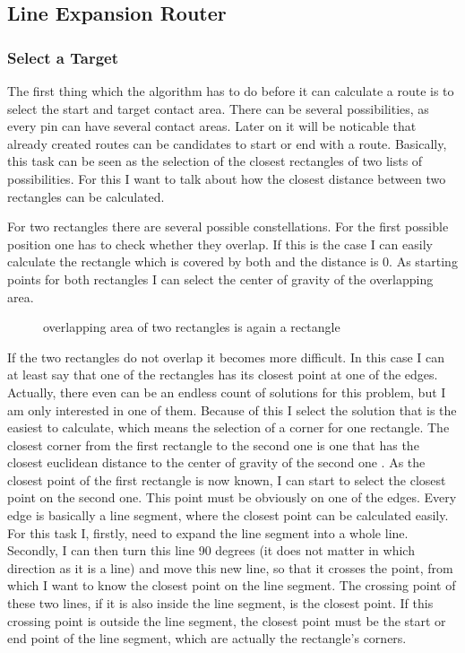\subsection{Line Expansion Router}

\subsubsection{Select a Target}
The first thing which the algorithm has to do before it can calculate a route is to select the start and target contact area. There can be several possibilities, as every pin can have several contact areas. Later on it will be noticable that already created routes can be candidates to start or end with a route. Basically, this task can be seen as the selection of the closest rectangles of two lists of possibilities. For this I want to talk about how the closest distance between two rectangles can be calculated.

For two rectangles there are several possible constellations. For the first possible position one has to check whether they overlap. If this is the case I can easily calculate the rectangle which is covered by both  and the distance is 0. As starting points for both rectangles I can select the center of gravity of the overlapping area.

\begin{figure}
	\centering
	
  	\caption{overlapping area of two rectangles is again a rectangle}
	\label{fig:rectangles_overlapping}
\end{figure}

If the two rectangles do not overlap it becomes more difficult. In this case I can at least say that one of the rectangles has its closest point at one of the edges. Actually, there even can be an endless count of solutions for this problem, but I am only interested in one of them. Because of this I select the solution that is the easiest to calculate, which means the selection of a corner for one rectangle. The closest corner from the first rectangle to the second one is one that has the closest euclidean distance to the center of gravity of the second one . As the closest point of the first rectangle is now known, I can start to select the closest point on the second one. This point must be obviously on one of the edges. Every edge is basically a line segment, where the closest point can be calculated easily. For this task I, firstly, need to expand the line segment into a whole line. Secondly, I can then turn this line 90 degrees (it does not matter in which direction as it is a line) and move this new line, so that it crosses the point, from which I want to know the closest point on the line segment. The crossing point of these two lines, if it is also inside the line segment, is the closest point. If this crossing point is outside the line segment, the closest point must be the start or end point of the line segment, which are actually the rectangle's corners.

